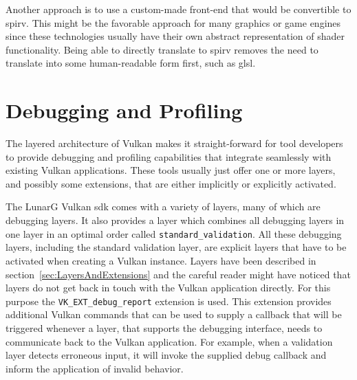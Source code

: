     Another approach is to use a custom-made front-end that would be convertible to \gls{spirv}. This might be the favorable approach for many graphics or game engines since these technologies usually have their own abstract representation of shader functionality. Being able to directly translate to \gls{spirv} removes the need to translate into some human-readable form first, such as \gls{glsl}.


  \section{Debugging and Profiling}
  \label{sec:DebuggingAndProfiling}
    The layered architecture of Vulkan makes it straight-forward for tool developers to provide debugging and profiling capabilities that integrate seamlessly with existing Vulkan applications. These tools usually just offer one or more layers, and possibly some extensions, that are either implicitly or explicitly activated.

    The LunarG Vulkan \gls{sdk} comes with a variety of layers, many of which are debugging layers. It also provides a layer which combines all debugging layers in one layer in an optimal order called \lstinline{standard_validation}. All these debugging layers, including the standard validation layer, are explicit layers that have to be activated when creating a Vulkan instance. Layers have been described in section~\ref{sec:LayersAndExtensions} and the careful reader might have noticed that layers do not get back in touch with the Vulkan application directly. For this purpose the \lstinline{VK_EXT_debug_report} extension is used. This extension provides additional Vulkan commands that can be used to supply a callback that will be triggered whenever a layer, that supports the debugging interface, needs to communicate back to the Vulkan application. For example, when a validation layer detects erroneous input, it will invoke the supplied debug callback and inform the application of invalid behavior.

